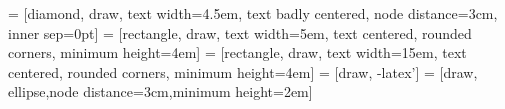 \documentclass{article}
\begin{document}
\newcommand{\mcode} {\texttt{GS\_MotherCode.r}}
\newcommand{\bigtt}[1] {\textcolor{darkblue}{{\large {\texttt{#1}}}}}


\tableofcontents

 = [diamond, draw,
    text width=4.5em, text badly centered, node distance=3cm, inner sep=0pt]
 = [rectangle, draw,
    text width=5em, text centered, rounded corners, minimum height=4em]
     = [rectangle, draw,
    text width=15em, text centered, rounded corners, minimum height=4em]
 = [draw, -latex']
 = [draw, ellipse,node distance=3cm,minimum height=2em]


\newpage
\end{document}
